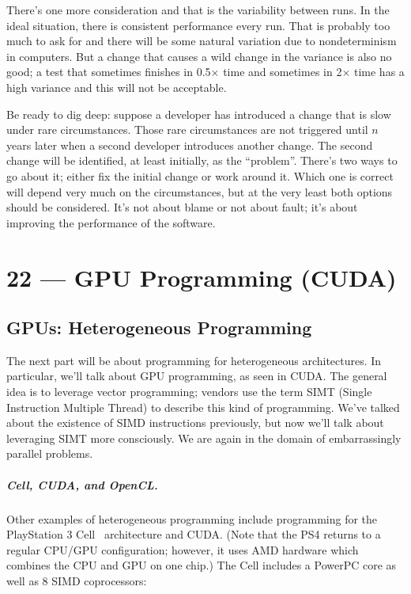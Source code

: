\documentclass[a4paper]{report}
\begin{document}
There's one more consideration and that is the variability between runs. In the ideal situation, there is consistent performance every run. That is probably too much to ask for and there will be some natural variation due to nondeterminism in computers. But a change that causes a wild change in the variance is also no good; a test that sometimes finishes in 0.5$\times$ time and sometimes in 2$\times$ time has a high variance and this will not be acceptable. 

Be ready to dig deep: suppose a developer has introduced a change that is slow under rare circumstances. Those rare circumstances are not triggered until $n$ years later when a second developer introduces another change. The second change will be identified, at least initially, as the ``problem''. There's two ways to go about it; either fix the initial change or work around it. Which one is correct will depend very much on the circumstances, but at the very least both options should be considered. It's not about blame or not about fault; it's about improving the performance of the software.










\chapter*{22 --- GPU Programming (CUDA)}


\section*{GPUs: Heterogeneous Programming}

The next part will be about programming for heterogeneous
architectures. In particular, we'll talk about GPU programming, as
seen in CUDA. The general idea is to
leverage vector programming; vendors use the term SIMT (Single
Instruction Multiple Thread) to describe this kind of
programming. We've talked about the existence of SIMD instructions
previously, but now we'll talk about leveraging SIMT more
consciously. We are again in the domain of embarrassingly parallel
problems.

\paragraph{Cell, CUDA, and OpenCL.} 
Other examples of heterogeneous programming include
programming for the PlayStation 3 Cell~\cite{cellprimer} architecture and CUDA. (Note that the PS4 returns to a regular CPU/GPU configuration; however, it uses AMD hardware which combines the CPU and GPU on one chip.) The Cell includes a PowerPC core as well as
8 SIMD coprocessors:
\end{document}

